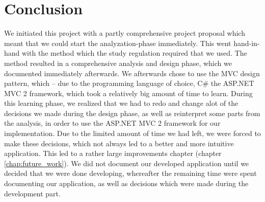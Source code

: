 \chapter{Conclusion}
\label{chap:conclusion}
We initiated this project with a partly comprehensive project proposal which meant that we could start the analyzation-phase immediately. This went hand-in-hand with the \ooad{} method which the study regulation required that we used. The \ooad{} method resulted in a comprehensive analysis and design phase, which we documented immediately afterwards. We afterwards chose to use the MVC design pattern, which -- due to the programming language of choice, C\# the ASP.NET MVC 2 framework, which took a relatively big amount of time to learn. During this learning phase, we realized that we had to redo and change alot of the decisions we made during the design phase, as well as reinterpret some parts from the analysis, in order to use the ASP.NET MVC 2 framework for our implementation. Due to the limited amount of time we had left, we were forced to make these decisions, which not always led to a better and more intuitive application. This led to a rather large improvements chapter (chapter \ref{chap:future_work}). We did not document our developed application until we decided that we were done developing, whereafter the remaining time were spent documenting our application, as well as decisions which were made during the development part.








